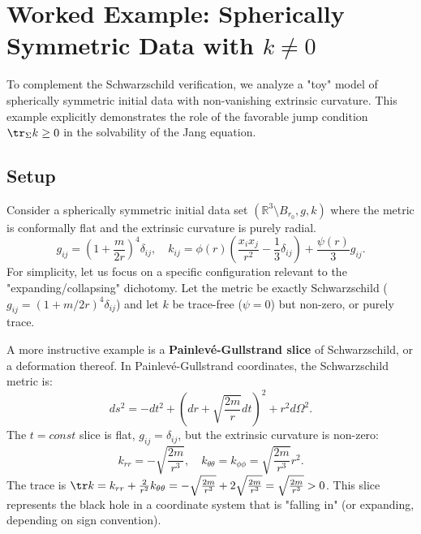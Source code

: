 \section{Worked Example: Spherically Symmetric Data with \texorpdfstring{$k \neq 0$}{k neq 0}}
\label{sec:ToyExampleKneq0}

To complement the Schwarzschild verification, we analyze a "toy" model of spherically symmetric initial data with non-vanishing extrinsic curvature. This example explicitly demonstrates the role of the favorable jump condition $\tr_\Sigma k \ge 0$ in the solvability of the Jang equation.

\subsection{Setup}
Consider a spherically symmetric initial data set $(\mathbb{R}^3 \setminus B_{r_0}, g, k)$ where the metric is conformally flat and the extrinsic curvature is purely radial.
\begin{equation}
    g_{ij} = \left(1 + \frac{m}{2r}\right)^4 \delta_{ij}, \quad k_{ij} = \phi(r) \left( \frac{x_i x_j}{r^2} - \frac{1}{3}\delta_{ij} \right) + \frac{\psi(r)}{3} g_{ij}.
\end{equation}
For simplicity, let us focus on a specific configuration relevant to the "expanding/collapsing" dichotomy. Let the metric be exactly Schwarzschild ($g_{ij} = (1 + m/2r)^4 \delta_{ij}$) and let $k$ be trace-free ($\psi=0$) but non-zero, or purely trace.

A more instructive example is a \textbf{Painlev\'e-Gullstrand slice} of Schwarzschild, or a deformation thereof.
In Painlev\'e-Gullstrand coordinates, the Schwarzschild metric is:
\[
ds^2 = -dt^2 + (dr + \sqrt{\frac{2m}{r}} dt)^2 + r^2 d\Omega^2.
\]
The $t=const$ slice is flat, $g_{ij} = \delta_{ij}$, but the extrinsic curvature is non-zero:
\[
k_{rr} = -\sqrt{\frac{2m}{r^3}}, \quad k_{\theta\theta} = k_{\phi\phi} = \sqrt{\frac{2m}{r^3}} r^2.
\]
The trace is $\tr k = k_{rr} + \frac{2}{r^2} k_{\theta\theta} = -\sqrt{\frac{2m}{r^3}} + 2\sqrt{\frac{2m}{r^3}} = \sqrt{\frac{2m}{r^3}} > 0$.
This slice represents the black hole in a coordinate system that is "falling in" (or expanding, depending on sign convention).

